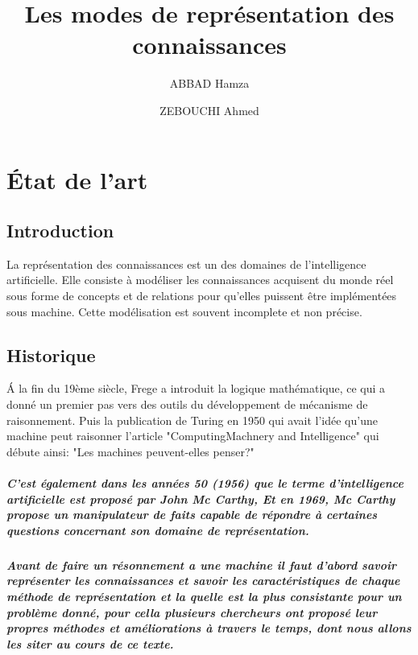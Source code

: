 \documentclass[12pt,a4paper]{report}
\author{ABBAD Hamza  \and ZEBOUCHI Ahmed}
\title{Les modes de représentation des connaissances}
\begin{document}
\maketitle

\chapter{\'Etat de l'art}
\section{Introduction}
La représentation des connaissances est un des domaines de l'intelligence artificielle. Elle consiste à modéliser
les connaissances acquisent du monde réel sous forme de concepts et de relations pour qu'elles puissent être
implémentées sous machine. Cette modélisation est souvent incomplete et non précise.\cite{WKR}
\section{Historique}
\'A la fin du 19ème siècle, Frege a introduit la logique mathématique, ce qui a donné un premier pas vers des outils du développement de mécanisme de raisonnement.  Puis la publication de Turing en 1950 qui avait l’idée qu’une machine peut raisonner  l’article "ComputingMachnery and Intelligence" qui débute ainsi: "Les machines peuvent-elles penser?"\paragraph{\normalfont
C'est également dans les années 50 (1956) que le terme d'intelligence artificielle est proposé par
John Mc Carthy, Et en 1969, Mc Carthy propose un manipulateur de faits capable de répondre à certaines questions concernant son domaine de représentation.}
\paragraph{\normalfont
Avant de faire un résonnement a une machine il faut d’abord savoir représenter les connaissances et savoir les caractéristiques de chaque méthode de représentation et la quelle est la plus consistante pour un problème donné, pour cella plusieurs chercheurs ont proposé leur propres méthodes et améliorations  à travers le temps, dont nous allons les siter au cours de ce texte.}
\end{document}
